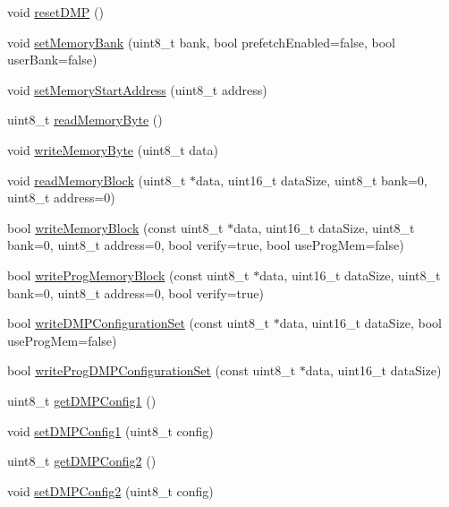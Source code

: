 \begin{DoxyCompactItemize}
\item 
void \hyperlink{classMPU6050_a7a9706f177e84b295739198e6b2ded95}{reset\+D\+MP} ()
\item 
void \hyperlink{classMPU6050_aa0c1753f6d2dacb1942fbef156a075bc}{set\+Memory\+Bank} (uint8\+\_\+t bank, bool prefetch\+Enabled=false, bool user\+Bank=false)
\item 
void \hyperlink{classMPU6050_a45013abb39103e858d432cc720bc351a}{set\+Memory\+Start\+Address} (uint8\+\_\+t address)
\item 
uint8\+\_\+t \hyperlink{classMPU6050_a4fb50ebcff2f4e686e3fbbafb70a1f75}{read\+Memory\+Byte} ()
\item 
void \hyperlink{classMPU6050_a20de45af9109402f0cfe785f8fdbf439}{write\+Memory\+Byte} (uint8\+\_\+t data)
\item 
void \hyperlink{classMPU6050_a04d8d5e7b62605aed15f07f52afa74ca}{read\+Memory\+Block} (uint8\+\_\+t $\ast$data, uint16\+\_\+t data\+Size, uint8\+\_\+t bank=0, uint8\+\_\+t address=0)
\item 
bool \hyperlink{classMPU6050_aae135772b45e1c7968b55f4f01b3757f}{write\+Memory\+Block} (const uint8\+\_\+t $\ast$data, uint16\+\_\+t data\+Size, uint8\+\_\+t bank=0, uint8\+\_\+t address=0, bool verify=true, bool use\+Prog\+Mem=false)
\item 
bool \hyperlink{classMPU6050_a201dc0aa819f451584c575c5a7590e10}{write\+Prog\+Memory\+Block} (const uint8\+\_\+t $\ast$data, uint16\+\_\+t data\+Size, uint8\+\_\+t bank=0, uint8\+\_\+t address=0, bool verify=true)
\item 
bool \hyperlink{classMPU6050_abe4f64f68164116b2ec94fe1d987929a}{write\+D\+M\+P\+Configuration\+Set} (const uint8\+\_\+t $\ast$data, uint16\+\_\+t data\+Size, bool use\+Prog\+Mem=false)
\item 
bool \hyperlink{classMPU6050_a160a3d018a81eb85a33874a43f44b3ea}{write\+Prog\+D\+M\+P\+Configuration\+Set} (const uint8\+\_\+t $\ast$data, uint16\+\_\+t data\+Size)
\item 
uint8\+\_\+t \hyperlink{classMPU6050_a421cdf4cea9fea87decbd69084ba4956}{get\+D\+M\+P\+Config1} ()
\item 
void \hyperlink{classMPU6050_a0126b95e4074de16bb61d9c4e4cf837f}{set\+D\+M\+P\+Config1} (uint8\+\_\+t config)
\item 
uint8\+\_\+t \hyperlink{classMPU6050_a29594027f88c291708a38fba67c4ecd5}{get\+D\+M\+P\+Config2} ()
\item 
void \hyperlink{classMPU6050_aea90c3e6a6666f070f7833a913cfa821}{set\+D\+M\+P\+Config2} (uint8\+\_\+t config)
\end{DoxyCompactItemize}

